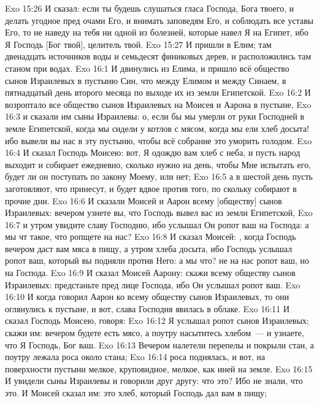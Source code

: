 \vs Exo 15:26 И сказал: если ты будешь слушаться гласа Господа, Бога твоего, и делать угодное пред очами Его, и внимать заповедям Его, и соблюдать все уставы Его, то не наведу на тебя ни одной из болезней, которые навел Я на Египет, ибо Я Господь [Бог твой], целитель твой.
\rsbpar\vs Exo 15:27 И пришли в Елим; там  двенадцать источников воды и семьдесят финиковых дерев, и расположились там станом при водах.
\vs Exo 16:1 И двинулись из Елима, и пришло всё общество сынов Израилевых в пустыню Син, что между Елимом и между Синаем, в пятнадцатый день второго месяца по выходе их из земли Египетской.
\vs Exo 16:2 И возроптало все общество сынов Израилевых на Моисея и Аарона в пустыне,
\vs Exo 16:3 и сказали им сыны Израилевы: о, если бы мы умерли от руки Господней в земле Египетской, когда мы сидели у котлов с мясом, когда мы ели хлеб досыта! ибо вывели вы нас в эту пустыню, чтобы всё собрание это уморить голодом.
\vs Exo 16:4 И сказал Господь Моисею: вот, Я одождю вам хлеб с неба, и пусть народ выходит и собирает ежедневно, сколько нужно на день, чтобы Мне испытать его, будет ли он поступать по закону Моему, или нет;
\vs Exo 16:5 а в шестой день пусть заготовляют, что принесут, и будет вдвое против того, по скольку собирают в прочие дни.
\vs Exo 16:6 И сказали Моисей и Аарон всему [обществу] сынов Израилевых: вечером узнете вы, что Господь вывел вас из земли Египетской,
\vs Exo 16:7 и утром увидите славу Господню, ибо услышал Он ропот ваш на Господа: а мы чт такое, что ропщете на нас?
\vs Exo 16:8 И сказал Моисей: , когда Господь вечером даст вам мяса в пищу, а утром хлеба досыта, ибо Господь услышал ропот ваш, который вы подняли против Него: а мы что? не на нас ропот ваш, но на Господа.
\vs Exo 16:9 И сказал Моисей Аарону: скажи всему обществу сынов Израилевых: предстаньте пред лице Господа, ибо Он услышал ропот ваш.
\vs Exo 16:10 И когда говорил Аарон ко всему обществу сынов Израилевых, то они оглянулись к пустыне, и вот, слава Господня явилась в облаке.
\rsbpar\vs Exo 16:11 И сказал Господь Моисею, говоря:
\vs Exo 16:12 Я услышал ропот сынов Израилевых; скажи им: вечером будете есть мясо, а поутру насытитесь хлебом~--- и узнаете, что Я Господь, Бог ваш.
\rsbpar\vs Exo 16:13 Вечером налетели перепелы и покрыли стан, а поутру лежала роса около стана;
\vs Exo 16:14 роса поднялась, и вот, на поверхности пустыни  мелкое, круповидное, мелкое, как иней на земле.
\vs Exo 16:15 И увидели сыны Израилевы и говорили друг другу: что это? Ибо не знали, что это. И Моисей сказал им: это хлеб, который Господь дал вам в пищу;
